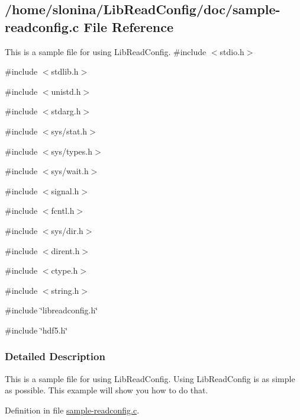 \hypertarget{sample-readconfig_8c}{
\subsection{/home/slonina/LibReadConfig/doc/sample-\/readconfig.c File Reference}
\label{sample-readconfig_8c}
}


This is a sample file for using LibReadConfig.  
{\ttfamily \#include $<$stdio.h$>$}\par
{\ttfamily \#include $<$stdlib.h$>$}\par
{\ttfamily \#include $<$unistd.h$>$}\par
{\ttfamily \#include $<$stdarg.h$>$}\par
{\ttfamily \#include $<$sys/stat.h$>$}\par
{\ttfamily \#include $<$sys/types.h$>$}\par
{\ttfamily \#include $<$sys/wait.h$>$}\par
{\ttfamily \#include $<$signal.h$>$}\par
{\ttfamily \#include $<$fcntl.h$>$}\par
{\ttfamily \#include $<$sys/dir.h$>$}\par
{\ttfamily \#include $<$dirent.h$>$}\par
{\ttfamily \#include $<$ctype.h$>$}\par
{\ttfamily \#include $<$string.h$>$}\par
{\ttfamily \#include \char`\"{}libreadconfig.h\char`\"{}}\par
{\ttfamily \#include \char`\"{}hdf5.h\char`\"{}}\par


\subsubsection{Detailed Description}
This is a sample file for using LibReadConfig. Using LibReadConfig is as simple as possible. This example will show you how to do that. 

Definition in file \hyperlink{sample-readconfig_8c_source}{sample-\/readconfig.c}.